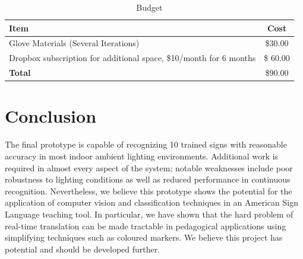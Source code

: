 \documentclass[12pt]{article}
\begin{document}
\begin{table}[h]
\centering
\caption{Budget}
\label{budget}
\begin{tabular}{|l|c|}

\hline
\textbf{Item} &     \textbf{Cost} \\ \hline
Glove Materials (Several Iterations)  &   \$30.00 \\ \hline
Dropbox subscription for additional space, \$10/month for 6 months  &  \$ 60.00 \\ \hline
\textbf{Total} &   \$90.00 \\ \hline
\end{tabular}

\end{table}

\newpage
\section{Conclusion}
The final prototype is capable of recognizing 10 trained signs with reasonable accuracy in most indoor ambient lighting environments. Additional work is required in almost every aspect of the system; notable weaknesses include poor robustness to lighting conditions as well as reduced performance in continuous recognition. Nevertheless, we believe this prototype shows the potential for the application of computer vision and classification techniques in an American Sign Language teaching tool. In particular, we have shown that the hard problem of real-time translation can be made tractable in pedagogical applications using simplifying techniques such as coloured markers. We believe this project has potential and should be developed further.


\newpage
\onehalfspacing



\end{document}
